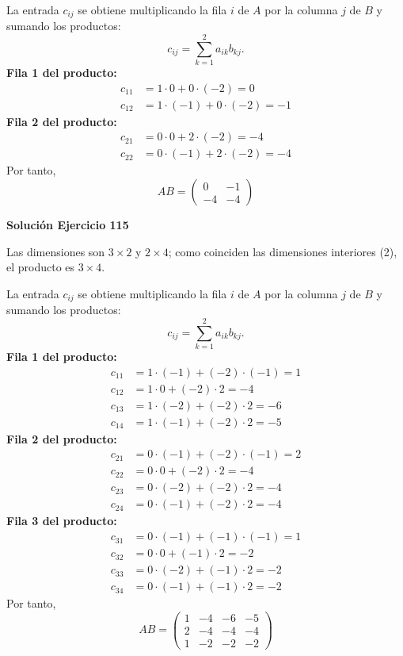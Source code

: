\documentclass[12pt]{article}
\theoremstyle{remark}
\begin{document}
La entrada $c_{ij}$ se obtiene multiplicando la fila $i$ de $A$ por la columna $j$ de $B$ y sumando los productos:
\[
c_{ij}=\sum_{k=1}^{2} a_{ik}b_{kj}.
\]
\textbf{Fila 1 del producto:}
\[
\begin{aligned}c_{11}&=1\cdot 0+0\cdot (-2)=0\\c_{12}&=1\cdot (-1)+0\cdot (-2)=-1\end{aligned}
\]
\textbf{Fila 2 del producto:}
\[
\begin{aligned}c_{21}&=0\cdot 0+2\cdot (-2)=-4\\c_{22}&=0\cdot (-1)+2\cdot (-2)=-4\end{aligned}
\]
Por tanto,
\[
\boxed{AB=\begin{pmatrix}0&-1\\-4&-4\end{pmatrix}}
\]

\par\bigskip\noindent\textbf{Solución Ejercicio 115}\par\nobreak
Las dimensiones son $3\times2$ y $2\times4$; como coinciden las dimensiones interiores (2), el producto es $3\times4$.

La entrada $c_{ij}$ se obtiene multiplicando la fila $i$ de $A$ por la columna $j$ de $B$ y sumando los productos:
\[
c_{ij}=\sum_{k=1}^{2} a_{ik}b_{kj}.
\]
\textbf{Fila 1 del producto:}
\[
\begin{aligned}c_{11}&=1\cdot (-1)+(-2)\cdot (-1)=1\\c_{12}&=1\cdot 0+(-2)\cdot 2=-4\\c_{13}&=1\cdot (-2)+(-2)\cdot 2=-6\\c_{14}&=1\cdot (-1)+(-2)\cdot 2=-5\end{aligned}
\]
\textbf{Fila 2 del producto:}
\[
\begin{aligned}c_{21}&=0\cdot (-1)+(-2)\cdot (-1)=2\\c_{22}&=0\cdot 0+(-2)\cdot 2=-4\\c_{23}&=0\cdot (-2)+(-2)\cdot 2=-4\\c_{24}&=0\cdot (-1)+(-2)\cdot 2=-4\end{aligned}
\]
\textbf{Fila 3 del producto:}
\[
\begin{aligned}c_{31}&=0\cdot (-1)+(-1)\cdot (-1)=1\\c_{32}&=0\cdot 0+(-1)\cdot 2=-2\\c_{33}&=0\cdot (-2)+(-1)\cdot 2=-2\\c_{34}&=0\cdot (-1)+(-1)\cdot 2=-2\end{aligned}
\]
Por tanto,
\[
\boxed{AB=\begin{pmatrix}1&-4&-6&-5\\2&-4&-4&-4\\1&-2&-2&-2\end{pmatrix}}
\]
\end{document}
